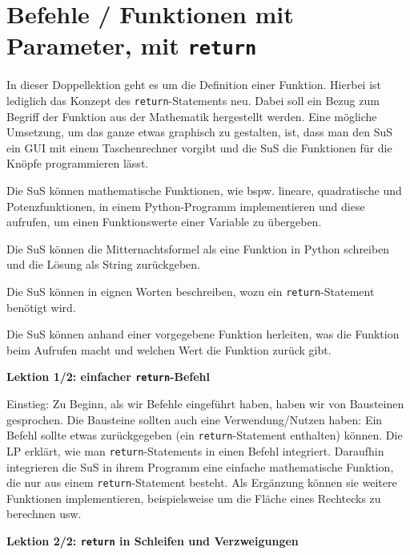 \section{Befehle / Funktionen mit Parameter, mit \texorpdfstring{\lstinline|return|}{return}}
\begin{myExBox}
	In dieser Doppellektion geht es um die Definition einer Funktion. Hierbei ist lediglich das Konzept des \lstinline|return|-Statements neu. Dabei soll ein Bezug zum Begriff der Funktion aus der Mathematik hergestellt werden. Eine mögliche Umsetzung, um das ganze etwas graphisch zu gestalten, ist, dass man den SuS ein GUI mit einem Taschenrechner vorgibt und die SuS die Funktionen für die Knöpfe programmieren lässt.

	\begin{todolist}
		\item Die SuS können mathematische Funktionen, wie bspw. lineare, quadratische und Potenzfunktionen, in einem Python-Programm implementieren und diese aufrufen, um einen Funktionswerte einer Variable zu übergeben.
		\item Die SuS können die Mitternachtsformel als eine Funktion in Python schreiben und die Lösung als String zurückgeben.
		\item Die SuS können in eignen Worten beschreiben, wozu ein \lstinline|return|-Statement benötigt wird.
		\item Die SuS können anhand einer vorgegebene Funktion herleiten, was die Funktion beim Aufrufen macht und welchen Wert die Funktion zurück gibt.
	\end{todolist}

	\textbf{Lektion 1/2: einfacher \lstinline|return|-Befehl}

	Einstieg: Zu Beginn, als wir Befehle eingeführt haben, haben wir von Bausteinen gesprochen. Die Bausteine sollten auch eine Verwendung/Nutzen haben: Ein Befehl sollte etwas zurückgegeben (ein \lstinline|return|-Statement enthalten) können. Die LP erklärt, wie man \lstinline|return|-Statements in einen Befehl integriert. Daraufhin integrieren die SuS in ihrem Programm eine einfache mathematische Funktion, die nur aus einem \lstinline|return|-Statement besteht. Als Ergänzung können sie weitere Funktionen implementieren, beispielsweise um die Fläche eines Rechtecks zu berechnen usw.

	\textbf{Lektion 2/2: \lstinline|return| in Schleifen und Verzweigungen}


\end{myExBox}
